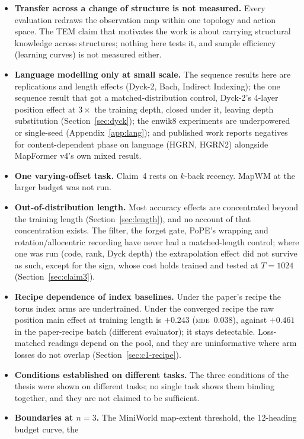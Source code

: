 \documentclass[10pt]{article}
\newcommand{\mde}{\textsc{mde}}
\begin{document}
\begin{itemize}
\item \textbf{Transfer across a change of structure is not measured.} Every evaluation redraws the
observation map within one topology and action space. The TEM claim that motivates the work is about
carrying structural knowledge across structures; nothing here tests it, and sample efficiency (learning
curves) is not measured either.
\item \textbf{Language modelling only at small scale.} The sequence results here are replications and
length effects (Dyck-2, Bach, Indirect Indexing); the one sequence result that got a matched-distribution
control, Dyck-2's 4-layer position effect at $3\times$ the training depth, closed under it, leaving depth
substitution (Section~\ref{sec:dyck}); the enwik8 experiments are underpowered or single-seed
(Appendix~\ref{app:lang}); and published work reports negatives for content-dependent phase on language
(HGRN, HGRN2) alongside MapFormer v4's own mixed result.
\item \textbf{One varying-offset task.} Claim~4 rests on $k$-back recency. MapWM at the larger budget
was not run.
\item \textbf{Out-of-distribution length.} Most accuracy effects are concentrated beyond the training length
(Section~\ref{sec:length}), and no account of that concentration exists. The filter,
the forget gate, PoPE's wrapping and rotation/allocentric recording have never had a matched-length control;
where one was run (code, rank, Dyck depth) the extrapolation effect did not survive as such, except for the
sign, whose cost holds trained and tested at $T=1024$ (Section~\ref{sec:claim3}).
\item \textbf{Recipe dependence of index baselines.} Under the paper's recipe the torus index arms are
undertrained. Under the converged recipe the raw position main effect at training length is $+0.243$
(\mde\ $0.038$), against $+0.461$ in the paper-recipe batch (different evaluator); it stays detectable. Loss-matched readings depend on the pool, and they are uninformative where arm losses do not
overlap (Section~\ref{sec:c1-recipe}).
\item \textbf{Conditions established on different tasks.} The three conditions of the thesis were shown on
different tasks; no single task shows them binding together, and they are not claimed to be sufficient.
\item \textbf{Boundaries at $n=3$.} The MiniWorld map-extent threshold, the 12-heading budget curve, the

\end{itemize}
\end{document}
